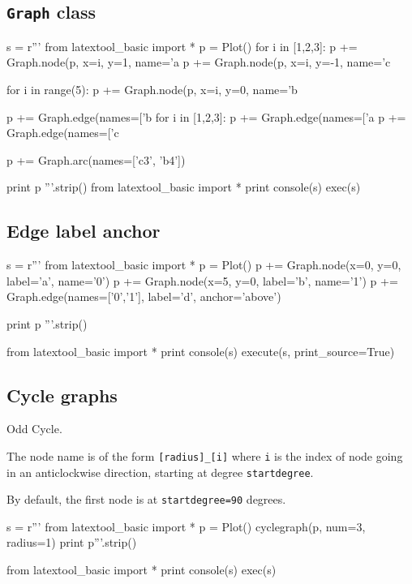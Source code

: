 \subsection{\texttt{Graph} class}


\begin{python}
s = r'''
from latextool_basic import *
p = Plot()
for i in [1,2,3]:
    p += Graph.node(p, x=i, y=1, name='a%
    p += Graph.node(p, x=i, y=-1, name='c%

for i in range(5):
    p += Graph.node(p, x=i, y=0, name='b%

p += Graph.edge(names=['b%
for i in [1,2,3]:
    p += Graph.edge(names=['a%
    p += Graph.edge(names=['c%

p += Graph.arc(names=['c3', 'b4'])

print p
'''.strip()
from latextool_basic import *
print console(s)
exec(s)
\end{python}




\newpage
\subsection{Edge label anchor}
\begin{python}
s = r'''
from latextool_basic import *
p = Plot()
p += Graph.node(x=0, y=0, label='a', name='0')
p += Graph.node(x=5, y=0, label='b', name='1')
p += Graph.edge(names=['0','1'], label='d', anchor='above')

print p
'''.strip()

from latextool_basic import *
print console(s)
execute(s, print_source=True)
\end{python}




\newpage
\subsection{Cycle graphs}

Odd Cycle.

The node name is of the form \verb![radius]_[i]!
where \verb!i! is the index of node going in an anticlockwise
direction, starting at degree \verb!startdegree!.

By default, the first node is at \verb!startdegree=90! degrees.

\begin{python}
s = r'''
from latextool_basic import *
p = Plot()
cyclegraph(p, num=3, radius=1)
print p'''.strip()

from latextool_basic import *
print console(s)
exec(s)
\end{python}


